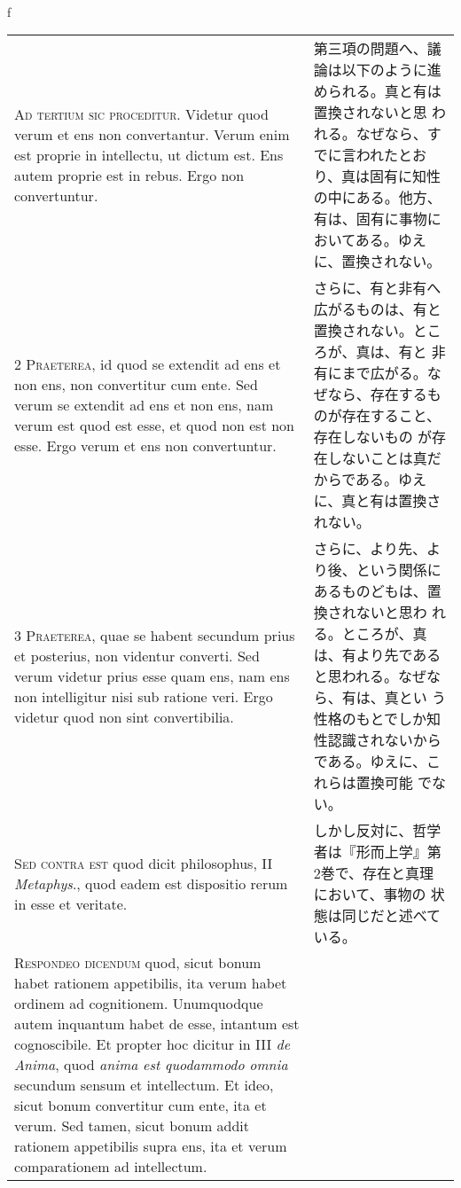 \\f\documentclass[10pt]{jsarticle} %
\begin{document}
\begin{longtable}{p{21em}p{21em}}

{\huge A}{\scshape d tertium sic proceditur}. Videtur quod verum et
ens non convertantur. Verum enim est proprie in intellectu, ut dictum
est. Ens autem proprie est in rebus. Ergo non convertuntur.

&

第三項の問題へ、議論は以下のように進められる。真と有は置換されないと思
われる。なぜなら、すでに言われたとおり、真は固有に知性の中にある。他方、
有は、固有に事物においてある。ゆえに、置換されない。

\\

{\scshape 2 Praeterea}, id quod se extendit ad ens et non ens, non
 convertitur cum ente. Sed verum se extendit ad ens et non ens, nam
 verum est quod est esse, et quod non est non esse. Ergo verum et ens
 non convertuntur.


&

さらに、有と非有へ広がるものは、有と置換されない。ところが、真は、有と
非有にまで広がる。なぜなら、存在するものが存在すること、存在しないもの
が存在しないことは真だからである。ゆえに、真と有は置換されない。

\\

{\scshape 3 Praeterea}, quae se habent secundum prius et posterius,
 non videntur converti. Sed verum videtur prius esse quam ens, nam ens
 non intelligitur nisi sub ratione veri. Ergo videtur quod non sint
 convertibilia.

&

さらに、より先、より後、という関係にあるものどもは、置換されないと思わ
れる。ところが、真は、有より先であると思われる。なぜなら、有は、真とい
う性格のもとでしか知性認識されないからである。ゆえに、これらは置換可能
でない。

\\


{\scshape Sed contra est} quod dicit philosophus, II {\itshape
 Metaphys}., quod eadem est dispositio rerum in esse et veritate.


&

しかし反対に、哲学者は『形而上学』第2巻で、存在と真理において、事物の
状態は同じだと述べている。

\\


{\scshape Respondeo dicendum} quod, sicut bonum habet rationem
 appetibilis, ita verum habet ordinem ad cognitionem. Unumquodque
 autem inquantum habet de esse, intantum est cognoscibile. Et propter
 hoc dicitur in III {\itshape de Anima}, quod {\itshape anima est
 quodammodo omnia} secundum sensum et intellectum. Et ideo, sicut
 bonum convertitur cum ente, ita et verum. Sed tamen, sicut bonum
 addit rationem appetibilis supra ens, ita et verum comparationem ad
 intellectum.



\end{longtable}
\end{document}
